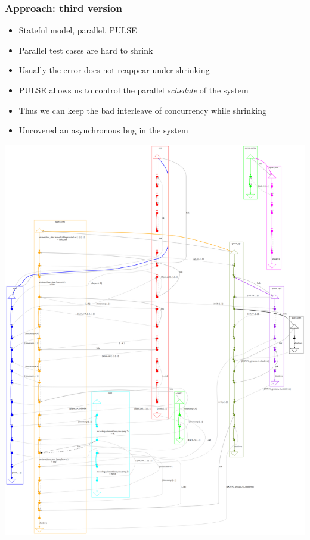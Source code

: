 \documentclass[lualatex]{beamer}
\begin{document}
\begin{frame}
  \frametitle{Approach: third version}
  \begin{itemize}
  \item Stateful model, parallel, PULSE
  \item Parallel test cases are hard to shrink
  \item Usually the error does not reappear under shrinking
  \item PULSE allows us to control the parallel \emph{schedule} of the
    system
  \item Thus we can keep the bad interleave of concurrency while
    shrinking
  \item Uncovered an asynchronous bug in the system
  \end{itemize}
\end{frame}

\begin{frame}[fragile]
  \includegraphics[scale=0.1]{pulse_output.png}
\end{frame}
\end{document}
